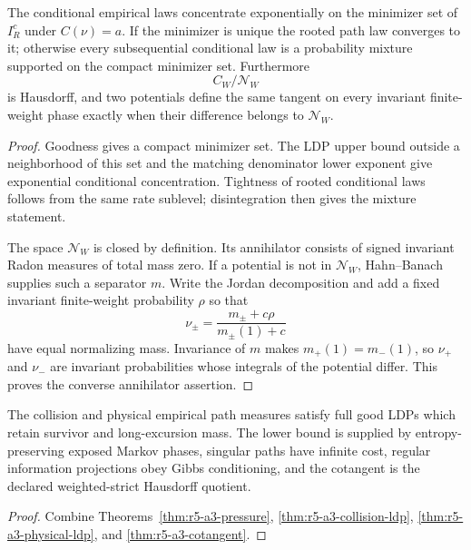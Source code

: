 \begin{theorem}
\label{thm:r5-a3-cotangent}
The conditional empirical laws concentrate exponentially on the minimizer set
of \(I_R^c\) under \(C(\nu)=a\).  If the minimizer is unique the rooted path
law converges to it; otherwise every subsequential conditional law is a
probability mixture supported on the compact minimizer set.
Furthermore
\[
 C_W/\mathscr N_W
\]
is Hausdorff, and two potentials define the same tangent on every invariant
finite-weight phase exactly when their difference belongs to
\(\mathscr N_W\).
\end{theorem}

\begin{proof}
Goodness gives a compact minimizer set.  The LDP upper bound outside a
neighborhood of this set and the matching denominator lower exponent give
exponential conditional concentration.  Tightness of rooted conditional laws
follows from the same rate sublevel; disintegration then gives the mixture
statement.

The space \(\mathscr N_W\) is closed by definition.  Its annihilator consists
of signed invariant Radon measures of total mass zero.  If a potential is not
in \(\mathscr N_W\), Hahn--Banach supplies such a separator \(m\).  Write the
Jordan decomposition and add a fixed invariant finite-weight probability
\(\rho\) so that
\[
 \nu_\pm=\frac{m_\pm+c\rho}{m_\pm(1)+c}
\]
have equal normalizing mass.  Invariance of \(m\) makes \(m_+(1)=m_-(1)\),
so \(\nu_+\) and \(\nu_-\) are invariant probabilities whose integrals of the
potential differ.  This proves the converse annihilator assertion.
\end{proof}

\begin{theorem}
\label{thm:r5-a3-main}
The collision and physical empirical path measures satisfy full good LDPs
which retain survivor and long-excursion mass.  The lower bound is supplied by
entropy-preserving exposed Markov phases, singular paths have infinite cost,
regular information projections obey Gibbs conditioning, and the cotangent is
the declared weighted-strict Hausdorff quotient.
\end{theorem}

\begin{proof}
Combine Theorems~\ref{thm:r5-a3-pressure},
\ref{thm:r5-a3-collision-ldp}, \ref{thm:r5-a3-physical-ldp}, and
\ref{thm:r5-a3-cotangent}.
\end{proof}
